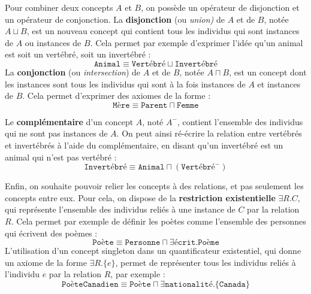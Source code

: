 Pour combiner deux concepts $A$ et $B$, on possède un opérateur de disjonction et un opérateur de conjonction. La \textbf{disjonction} (ou \textit{union)} de $A$ et de $B$, notée $A \sqcup B$, est un nouveau concept qui contient tous les individus qui sont instances de $A$ ou instances de $B$. Cela permet par exemple d'exprimer l'idée qu'un animal est soit un vertébré, soit un invertébré :
\begin{equation}
    \texttt{Animal} \equiv \texttt{Vertébré} \sqcup \texttt{Invertébré}
\end{equation}
La \textbf{conjonction} (ou \textit{intersection}) de $A$ et de $B$, notée $A \sqcap B$, est un concept dont les instances sont tous les individus qui sont à la fois instances de $A$ et instances de $B$. Cela permet d'exprimer des axiomes de la forme :
\begin{equation}
    \texttt{Mère} \equiv \texttt{Parent} \sqcap \texttt{Femme}
\end{equation}

Le \textbf{complémentaire} d'un concept $A$, noté $A^-$, contient l'ensemble des individus qui ne sont pas instances de $A$. On peut ainsi ré-écrire la relation entre vertébrés et invertébrés à l'aide du complémentaire, en disant qu'un invertébré est un animal qui n'est pas vertébré :
\begin{equation}
    \texttt{Invertébré} \equiv \texttt{Animal} \sqcap (\texttt{Vertébré}^-)
\end{equation}

Enfin, on souhaite pouvoir relier les concepts à des relations, et pas seulement les concepts entre eux. Pour cela, on dispose de la \textbf{restriction existentielle} $\exists R.C$, qui représente l'ensemble des individus reliés à une instance de $C$ par la relation $R$. Cela permet par exemple de définir les poètes comme l'ensemble des personnes qui écrivent des poèmes :
\begin{equation}
    \texttt{Poète} \equiv \texttt{Personne} \sqcap \exists \texttt{écrit}.\texttt{Poème}
\end{equation}
L'utilisation d'un concept singleton dans un quantificateur existentiel, qui donne un axiome de la forme $\exists R.\{ e \}$, permet de représenter tous les individus reliés à l'individu $e$ par la relation $R$, par exemple :
\begin{equation}
    \texttt{PoèteCanadien} \equiv \texttt{Poète} \sqcap \exists  \texttt{nationalité}. \{\texttt{Canada} \}
\end{equation}

